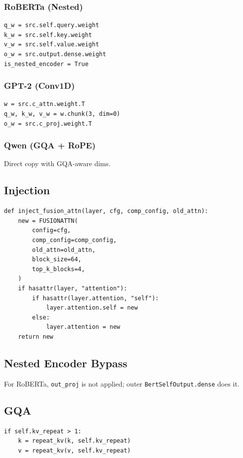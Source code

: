 \subsubsection{RoBERTa (Nested)}
\begin{lstlisting}
q_w = src.self.query.weight
k_w = src.self.key.weight
v_w = src.self.value.weight
o_w = src.output.dense.weight
is_nested_encoder = True
\end{lstlisting}

\subsubsection{GPT-2 (Conv1D)}
\begin{lstlisting}
w = src.c_attn.weight.T
q_w, k_w, v_w = w.chunk(3, dim=0)
o_w = src.c_proj.weight.T
\end{lstlisting}

\subsubsection{Qwen (GQA + RoPE)}
Direct copy with GQA-aware dims.

\subsection{Injection}

\begin{lstlisting}
def inject_fusion_attn(layer, cfg, comp_config, old_attn):
    new = FUSIONATTN(
        config=cfg,
        comp_config=comp_config,
        old_attn=old_attn,
        block_size=64,
        top_k_blocks=4,
    )
    if hasattr(layer, "attention"):
        if hasattr(layer.attention, "self"):
            layer.attention.self = new
        else:
            layer.attention = new
    return new
\end{lstlisting}

\subsection{Nested Encoder Bypass}

For RoBERTa, \texttt{out\_proj} is not applied; outer \texttt{BertSelfOutput.dense} does it.

\subsection{GQA}

\begin{lstlisting}
if self.kv_repeat > 1:
    k = repeat_kv(k, self.kv_repeat)
    v = repeat_kv(v, self.kv_repeat)
\end{lstlisting}

